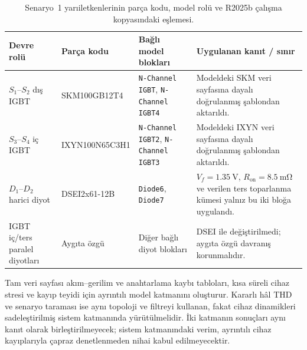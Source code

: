 \begin{table}[htbp]
  \centering
  \caption{Senaryo~1 yarıiletkenlerinin parça kodu, model rolü ve R2025b çalışma kopyasındaki eşlemesi.}
  \label{tab:yariiletken-esleme}
  \footnotesize
  \begin{tabularx}{\textwidth}{>{\raggedright\arraybackslash}p{} >{\raggedright\arraybackslash}p{} >{\raggedright\arraybackslash}p{} >{\raggedright\arraybackslash}X}
    \toprule
    Devre rolü & Parça kodu & Bağlı model blokları & Uygulanan kanıt / sınır \\
    \midrule
    $S_1$--$S_2$ dış IGBT & SKM100GB12T4 & \texttt{N-Channel IGBT}, \texttt{N-Channel IGBT4} & Modeldeki SKM veri sayfasına dayalı doğrulanmış şablondan aktarıldı. \\
    $S_3$--$S_4$ iç IGBT & IXYN100N65C3H1 & \texttt{N-Channel IGBT2}, \texttt{N-Channel IGBT3} & Modeldeki IXYN veri sayfasına dayalı doğrulanmış şablondan aktarıldı. \\
    $D_1$--$D_2$ harici diyot & DSEI2x61-12B & \texttt{Diode6}, \texttt{Diode7} & $V_f=\SI{1.35}{\volt}$, $R_{\mathrm{on}}=\SI{8.5}{\milli\ohm}$ ve verilen ters toparlanma kümesi yalnız bu iki bloğa uygulandı. \\
    IGBT iç/ters paralel diyotları & Aygıta özgü & Diğer bağlı diyot blokları & DSEI ile değiştirilmedi; aygıta özgü davranış korunmalıdır. \\
    \bottomrule
  \end{tabularx}
\end{table}

Tam veri sayfası akım--gerilim ve anahtarlama kaybı tabloları, kısa süreli cihaz stresi ve kayıp teyidi için ayrıntılı model katmanını oluşturur. Kararlı hâl THD ve senaryo taraması ise aynı topoloji ve filtreyi kullanan, fakat cihaz dinamikleri sadeleştirilmiş sistem katmanında yürütülmelidir. İki katmanın sonuçları aynı kanıt olarak birleştirilmeyecek; sistem katmanındaki verim, ayrıntılı cihaz kayıplarıyla çapraz denetlenmeden nihai kabul edilmeyecektir.


